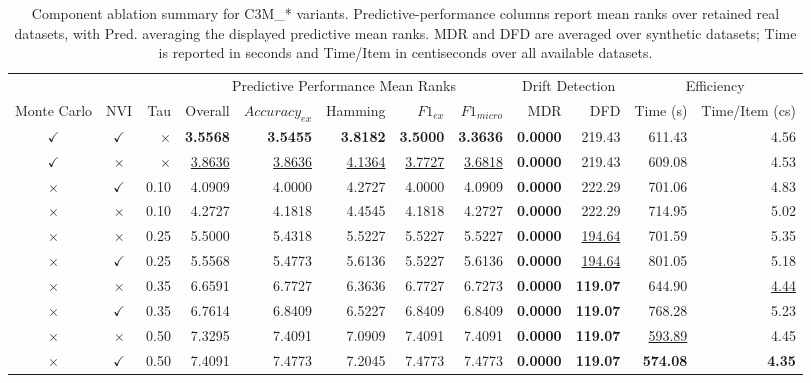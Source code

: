 \begin{table}
\caption{Component ablation summary for C3M\_* variants. Predictive-performance columns report mean ranks over retained real datasets, with Pred. averaging the displayed predictive mean ranks. MDR and DFD are averaged over synthetic datasets; Time is reported in seconds and Time/Item in centiseconds over all available datasets.}
\label{tab:component_ablation_summary}
\begin{tabular}{ccrrrrrrrrrr}
\toprule
 &  &  & \multicolumn{5}{c}{Predictive Performance Mean Ranks} & \multicolumn{2}{c}{Drift Detection} & \multicolumn{2}{c}{Efficiency} \\
\cmidrule(lr){4-8} \cmidrule(lr){9-10} \cmidrule(lr){11-12}
Monte Carlo & NVI & Tau & Overall & $Accuracy_{ex}$ & Hamming & $F1_{ex}$ & $F1_{micro}$ & MDR & DFD & Time (s) & Time/Item (cs) \\
\midrule
$\checkmark$ & $\checkmark$ & $\times$ & \textbf{3.5568} & \textbf{3.5455} & \textbf{3.8182} & \textbf{3.5000} & \textbf{3.3636} & \textbf{0.0000} & 219.43 & 611.43 & 4.56 \\
$\checkmark$ & $\times$ & $\times$ & \underline{3.8636} & \underline{3.8636} & \underline{4.1364} & \underline{3.7727} & \underline{3.6818} & \textbf{0.0000} & 219.43 & 609.08 & 4.53 \\
$\times$ & $\checkmark$ & 0.10 & 4.0909 & 4.0000 & 4.2727 & 4.0000 & 4.0909 & \textbf{0.0000} & 222.29 & 701.06 & 4.83 \\
$\times$ & $\times$ & 0.10 & 4.2727 & 4.1818 & 4.4545 & 4.1818 & 4.2727 & \textbf{0.0000} & 222.29 & 714.95 & 5.02 \\
$\times$ & $\times$ & 0.25 & 5.5000 & 5.4318 & 5.5227 & 5.5227 & 5.5227 & \textbf{0.0000} & \underline{194.64} & 701.59 & 5.35 \\
$\times$ & $\checkmark$ & 0.25 & 5.5568 & 5.4773 & 5.6136 & 5.5227 & 5.6136 & \textbf{0.0000} & \underline{194.64} & 801.05 & 5.18 \\
$\times$ & $\times$ & 0.35 & 6.6591 & 6.7727 & 6.3636 & 6.7727 & 6.7273 & \textbf{0.0000} & \textbf{119.07} & 644.90 & \underline{4.44} \\
$\times$ & $\checkmark$ & 0.35 & 6.7614 & 6.8409 & 6.5227 & 6.8409 & 6.8409 & \textbf{0.0000} & \textbf{119.07} & 768.28 & 5.23 \\
$\times$ & $\times$ & 0.50 & 7.3295 & 7.4091 & 7.0909 & 7.4091 & 7.4091 & \textbf{0.0000} & \textbf{119.07} & \underline{593.89} & 4.45 \\
$\times$ & $\checkmark$ & 0.50 & 7.4091 & 7.4773 & 7.2045 & 7.4773 & 7.4773 & \textbf{0.0000} & \textbf{119.07} & \textbf{574.08} & \textbf{4.35} \\
\bottomrule
\end{tabular}
\end{table}
